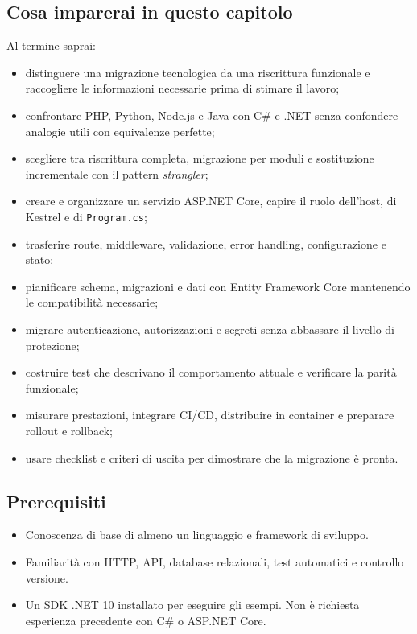 \documentclass[
  italian,
  10pt,
]{book}
\providecommand{\tightlist}{%
  \setlength{\itemsep}{0pt}\setlength{\parskip}{0pt}}
\begin{document}
\subsection{Cosa imparerai in questo
capitolo}\label{cosa-imparerai-in-questo-capitolo-4}

Al termine saprai:

\begin{itemize}
\tightlist
\item
  distinguere una migrazione tecnologica da una riscrittura funzionale e
  raccogliere le informazioni necessarie prima di stimare il lavoro;
\item
  confrontare PHP, Python, Node.js e Java con C\# e .NET senza
  confondere analogie utili con equivalenze perfette;
\item
  scegliere tra riscrittura completa, migrazione per moduli e
  sostituzione incrementale con il pattern \emph{strangler};
\item
  creare e organizzare un servizio ASP.NET Core, capire il ruolo
  dell'host, di Kestrel e di \texttt{Program.cs};
\item
  trasferire route, middleware, validazione, error handling,
  configurazione e stato;
\item
  pianificare schema, migrazioni e dati con Entity Framework Core
  mantenendo le compatibilità necessarie;
\item
  migrare autenticazione, autorizzazioni e segreti senza abbassare il
  livello di protezione;
\item
  costruire test che descrivano il comportamento attuale e verificare la
  parità funzionale;
\item
  misurare prestazioni, integrare CI/CD, distribuire in container e
  preparare rollout e rollback;
\item
  usare checklist e criteri di uscita per dimostrare che la migrazione è
  pronta.
\end{itemize}

\subsection{Prerequisiti}\label{prerequisiti-4}

\begin{itemize}
\tightlist
\item
  Conoscenza di base di almeno un linguaggio e framework di sviluppo.
\item
  Familiarità con HTTP, API, database relazionali, test automatici e
  controllo versione.
\item
  Un SDK .NET 10 installato per eseguire gli esempi. Non è richiesta
  esperienza precedente con C\# o ASP.NET Core.
\end{itemize}
\end{document}
